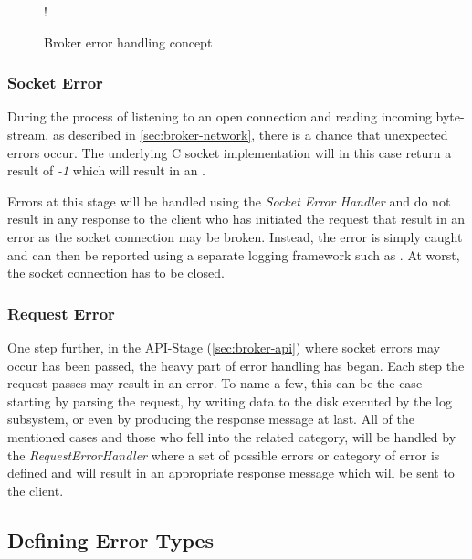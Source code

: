 \begin{figure}[H]
  \centering
   {!} {
    
  }
  \caption{Broker error handling concept}
  \label{fig:broker-error-activity}
\end{figure}

\subsubsection{Socket Error}

During the process of listening to an open connection and reading incoming
byte-stream, as described in \ref{sec:broker-network}, there is a chance that
unexpected errors occur. The underlying C socket implementation will in this
case return a result of \textit{-1} which will result in an
. 

Errors at this stage will be handled using the \textit{Socket Error Handler} and
do not result in any response to the client who has initiated the request that
result in an error as the socket connection may be broken. Instead, the error is
simply caught and can then be reported using a separate logging framework such
as . At worst, the
socket connection has to be closed.

\subsubsection{Request Error}

One step further, in the API-Stage (\ref{sec:broker-api}) where socket errors
may occur has been passed, the heavy part of error handling has began. Each step
the request passes may result in an error. To name a few, this can be the case
starting by parsing the request, by writing data to the disk executed by the log
subsystem, or even by producing the response message at last. All of the
mentioned cases and those who fell into the related category, will be handled by
the \textit{RequestErrorHandler} where a set of possible errors or category of
error is defined and will result in an appropriate response message which will
be sent to the client.


\subsection{Defining Error Types}

